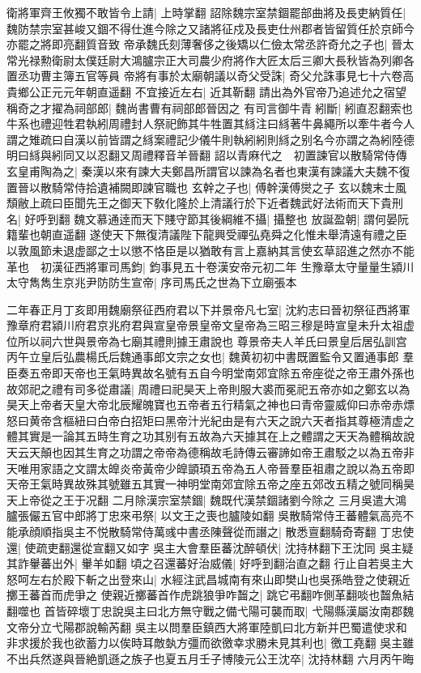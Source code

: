 衛將軍齊王攸獨不敢皆令上請|{
	上時掌翻}
詔除魏宗室禁錮罷部曲將及長吏納質任|{
	魏防禁宗室甚峻又錮不得仕進今除之又諸將征戍及長吏仕州郡者皆留質任於京師今亦罷之將即亮翻質音致}
帝承魏氏刻薄奢侈之後矯以仁儉太常丞許奇允之子也|{
	晉太常光禄勲衛尉太僕廷尉大鴻臚宗正大司農少府將作大匠太后三卿大長秋皆為列卿各置丞功曹主簿五官等員}
帝將有事於太廟朝議以奇父受誅|{
	奇父允誅事見七十六卷高貴鄉公正元元年朝直遥翻}
不宜接近左右|{
	近其靳翻}
請出為外官帝乃追述允之宿望稱奇之才擢為祠部郎|{
	魏尚書曹有祠部郎晉因之}
有司言御牛青紖斷|{
	紖直忍翻索也牛系也禮迎牲君執紖周禮封人祭祀飾其牛牲置其絼注曰絼著牛鼻繩所以牽牛者今人謂之雉疏曰自漢以前皆謂之絼案禮記少儀牛則執紖紖則絼之别名今亦謂之為紖陸德明曰絼與紖同又以忍翻又周禮釋音羊晉翻}
詔以青麻代之　初置諫官以散騎常侍傳玄皇甫陶為之|{
	秦漢以來有諫大夫鄭昌所謂官以諫為名者也東漢有諫議大夫魏不復置晉以散騎常侍拾遺補闕即諫官職也}
玄幹之子也|{
	傅幹漢傅爕之子}
玄以魏末士風頹敝上疏曰臣聞先王之御天下敎化隆於上清議行於下近者魏武好法術而天下貴刑名|{
	好呼到翻}
魏文慕通逹而天下賤守節其後綱維不攝|{
	攝整也}
放誕盈朝|{
	謂何晏阮籍輩也朝直遥翻}
遂使天下無復清議陛下龍興受禪弘堯舜之化惟未舉清遠有禮之臣以敦風節未退虚鄙之士以懲不恪臣是以猶敢有言上嘉納其言使玄草詔進之然亦不能革也　初漢征西將軍司馬鈞|{
	鈞事見五十卷漢安帝元初二年}
生豫章太守量量生潁川太守雋雋生京兆尹防防生宣帝|{
	序司馬氏之世為下立廟張本}


二年春正月丁亥即用魏廟祭征西府君以下并景帝凡七室|{
	沈約志曰晉初祭征西將軍豫章府君潁川府君京兆府君與宣皇帝景皇帝文皇帝為三昭三穆是時宣皇未升太祖虚位所以祠六世與景帝為七廟其禮則據王肅說也}
尊景帝夫人羊氏曰景皇后居弘訓宫　丙午立皇后弘農楊氏后魏通事郎文宗之女也|{
	魏黄初初中書既置監令又置通事郎}
羣臣奏五帝即天帝也王氣時異故名號有五自今明堂南郊宜除五帝座從之帝王肅外孫也故郊祀之禮有司多從肅議|{
	周禮曰祀昊天上帝則服大裘而冕祀五帝亦如之鄭玄以為昊天上帝者天皇大帝北辰耀魄寶也五帝者五行精氣之神也曰青帝靈威仰曰赤帝赤熛怒曰黄帝含樞紐曰白帝白招矩曰黑帝汁光紀由是有六天之說六天者指其尊極清虚之體其實是一論其五時生育之功其别有五故為六天據其在上之體謂之天天為體稱故說天云天顛也因其生育之功謂之帝帝為德稱故毛詩傳云審諦如帝王肅駁之以為五帝非天唯用家語之文謂太皥炎帝黃帝少皥顗頊五帝為五人帝晉羣臣祖肅之說以為五帝即天帝王氣時異故殊其號雖五其實一神明堂南郊宜除五帝之座五郊改五精之號同稱昊天上帝從之王于况翻}
二月除漢宗室禁錮|{
	魏既代漢禁錮諸劉今除之}
三月吳遣大鴻臚張儼五官中郎將丁忠來弔祭|{
	以文王之喪也臚陵如翻}
吳散騎常侍王蕃體氣高亮不能承顔順指吳主不悦散騎常侍萬彧中書丞陳聲從而譖之|{
	散悉亶翻騎奇寄翻}
丁忠使還|{
	使疏吏翻還從宣翻又如字}
吳主大會羣臣蕃沈醉頓伏|{
	沈持林翻下王沈同}
吳主疑其詐轝蕃出外|{
	轝羊如翻}
頃之召還蕃好治威儀|{
	好呼到翻治直之翻}
行止自若吳主大怒呵左右於殿下斬之出登來山|{
	水經注武昌城南有來山即樊山也吳孫皓登之使親近擲王蕃首而虎爭之}
使親近擲蕃首作虎跳狼爭咋齧之|{
	跳它弔翻咋側革翻啖也齧魚結翻噬也}
首皆碎壞丁忠說吳主曰北方無守戰之備弋陽可襲而取|{
	弋陽縣漢屬汝南郡魏文帝分立弋陽郡說輸芮翻}
吳主以問羣臣鎮西大將軍陸凱曰北方新并巴蜀遣使求和非求援於我也欲蓄力以俟時耳敵埶方彊而欲徼幸求勝未見其利也|{
	徼工堯翻}
吳主雖不出兵然遂與晉絶凱遜之族子也夏五月壬子博陵元公王沈卒|{
	沈持林翻}
六月丙午晦

